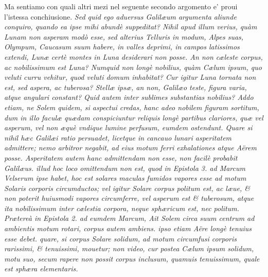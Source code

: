 \documentclass[11pt,twoside,openany]{book}
\begin{document}
\par\bigskip\noindent{}\enspace Ma sentiamo con quali altri mezi nel seguente secondo argomento e' proui l'istessa conchiusione. \textit{Sed quid ego aduersus Galilæum argumenta aliunde conquiro, quando ea ipse m}\textit{ihi abundè suppeditat? Nihil apud illum verius, quàm Lunam non asperam modò esse, sed alterius Telluris in modum, Alpes suas, Olympum, Caucasum suum habere, in valles deprimi, in campos latissimos extendi, Lunæ certè montes in Luna desiderari non posse. An non cæleste corpus, ac nobilissimum est Luna? Numquid non longè nobilius, quàm Cælum ipsum, quo veluti curru vehitur, quod veluti domum inhabitat? Cur igitur Luna tornata non est, sed aspera, ac tuberosa? Stellæ ipsæ, an non, Galilæo teste, figura varia, atque angulari constant? Quid autem inter sublimes substantias nobilius? Addo etiam, ne Solem quidem, si aspectui credas, hanc adeo nobilem figuram sortitum, dum in illo faculæ quædam conspiciuntur reliquis longè partibus clariores, quæ vel asperum, vel non æquè vndique lumine perfusum, eumdem ostendunt. Quare si nihil hæc Galilæi ratio persuadet, licetque in cancauo lunari asperitatem admittere; nemo arbitror negabit, ad eius }\textit{motum ferri exhalationes atque Aërem posse. Asperitatem autem hanc admittendam non esse, non facilè probabit Galilæus. illud hoc loco omittendum non est, quod in Epistola 3. ad Marcum Velserum ipse habet, hoc est solares maculas fumidos vapores esse ad motum Solaris corporis circumductos; vel igitur Solare corpus politum est, ac læue, \& non poterit huiusmodi vapores circumferre, vel asperum est \& tuberosum, atque ita nobilissimum inter cælestia corpora, neque sphæricum est, nec politum. Prætereà in Epistola 2. ad eumdem Marcum, Ait Solem circa suum centrum ad ambientis motum rotari, corpus autem ambiens. ipso etiam Aëre longè tenuius esse debet. quare, si corpus Solare solidum, ad motum circumfusi corporis rarissimi, \& tenuissimi, mouetur; non video, cur postea Cælum ipsum solidum, motu suo, secum rapere non possit corpus inclusum, quamuis tenuissimum, quale est sphæra elementaris.}
\end{document}
